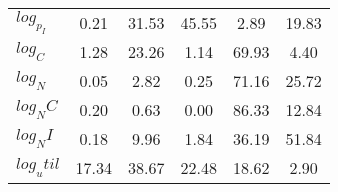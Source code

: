 \begin{center}
\begin{longtable}{lccccc}
$log_p_I   $	 & 	        0.21	 & 	       31.53	 & 	       45.55	 & 	        2.89	 & 	       19.83 \\ 
$log_C     $	 & 	        1.28	 & 	       23.26	 & 	        1.14	 & 	       69.93	 & 	        4.40 \\ 
$log_N     $	 & 	        0.05	 & 	        2.82	 & 	        0.25	 & 	       71.16	 & 	       25.72 \\ 
$log_NC    $	 & 	        0.20	 & 	        0.63	 & 	        0.00	 & 	       86.33	 & 	       12.84 \\ 
$log_NI    $	 & 	        0.18	 & 	        9.96	 & 	        1.84	 & 	       36.19	 & 	       51.84 \\ 
$log_util  $	 & 	       17.34	 & 	       38.67	 & 	       22.48	 & 	       18.62	 & 	        2.90 \\ 
\end{longtable}
 \end{center}
